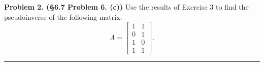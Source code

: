 \documentclass[leqno]{article}
\theoremstyle{nonumberplain}
\begin{document}


\noindent\textbf{Problem 2. (\S 6.7 Problem 6. (c))} Use the results of Exercise 3 to find the pseudoinverse of the following matrix:
\[
A=\begin{bmatrix}
1 & 1\\
0 & 1\\
1 & 0\\
1 & 1
\end{bmatrix}.
\]

\noindent\rule[0.5ex]{\linewidth}{1pt}
\end{document}
